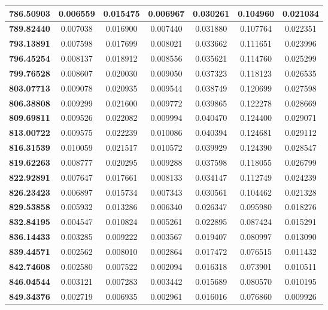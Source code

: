 \documentclass[11pt]{article}
\begin{document}
\begin{appendices}
\begin{longtable}{|c|c|c|c|c|c|c|}
	\textbf{786.50903} & 0.006559 & 0.015475 & 0.006967 & 0.030261 & 0.104960 & 0.021034 \\ \hline
	\textbf{789.82440} & 0.007038 & 0.016900 & 0.007440 & 0.031880 & 0.107764 & 0.022351 \\ \hline
	\textbf{793.13891} & 0.007598 & 0.017699 & 0.008021 & 0.033662 & 0.111651 & 0.023996 \\ \hline
	\textbf{796.45254} & 0.008137 & 0.018912 & 0.008556 & 0.035621 & 0.114760 & 0.025299 \\ \hline
	\textbf{799.76528} & 0.008607 & 0.020030 & 0.009050 & 0.037323 & 0.118123 & 0.026535 \\ \hline
	\textbf{803.07713} & 0.009078 & 0.020935 & 0.009544 & 0.038749 & 0.120699 & 0.027598 \\ \hline
	\textbf{806.38808} & 0.009299 & 0.021600 & 0.009772 & 0.039865 & 0.122278 & 0.028669 \\ \hline
	\textbf{809.69811} & 0.009526 & 0.022082 & 0.009994 & 0.040470 & 0.124400 & 0.029071 \\ \hline
	\textbf{813.00722} & 0.009575 & 0.022239 & 0.010086 & 0.040394 & 0.124681 & 0.029112 \\ \hline
	\textbf{816.31539} & 0.010059 & 0.021517 & 0.010572 & 0.039929 & 0.124390 & 0.028547 \\ \hline
	\textbf{819.62263} & 0.008777 & 0.020295 & 0.009288 & 0.037598 & 0.118055 & 0.026799 \\ \hline
	\textbf{822.92891} & 0.007647 & 0.017661 & 0.008133 & 0.034147 & 0.112749 & 0.024239 \\ \hline
	\textbf{826.23423} & 0.006897 & 0.015734 & 0.007343 & 0.030561 & 0.104462 & 0.021328 \\ \hline
	\textbf{829.53858} & 0.005932 & 0.013286 & 0.006340 & 0.026347 & 0.095980 & 0.018276 \\ \hline
	\textbf{832.84195} & 0.004547 & 0.010824 & 0.005261 & 0.022895 & 0.087424 & 0.015291 \\ \hline
	\textbf{836.14433} & 0.003285 & 0.009222 & 0.003567 & 0.019407 & 0.080997 & 0.013090 \\ \hline
	\textbf{839.44571} & 0.002562 & 0.008010 & 0.002864 & 0.017472 & 0.076515 & 0.011432 \\ \hline
	\textbf{842.74608} & 0.002580 & 0.007522 & 0.002094 & 0.016318 & 0.073901 & 0.010511 \\ \hline
	\textbf{846.04544} & 0.003121 & 0.007283 & 0.003442 & 0.015689 & 0.080570 & 0.010195 \\ \hline
	\textbf{849.34376} & 0.002719 & 0.006935 & 0.002961 & 0.016016 & 0.076860 & 0.009926 \\ \hline

\end{longtable}
\end{appendices}
\end{document}
